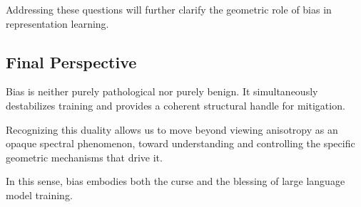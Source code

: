 Addressing these questions will further clarify the geometric
role of bias in representation learning.

\subsection{Final Perspective}

Bias is neither purely pathological nor purely benign.
It simultaneously destabilizes training
and provides a coherent structural handle for mitigation.

Recognizing this duality
allows us to move beyond viewing anisotropy
as an opaque spectral phenomenon,
toward understanding and controlling
the specific geometric mechanisms that drive it.

In this sense, bias embodies both
the curse and the blessing
of large language model training.